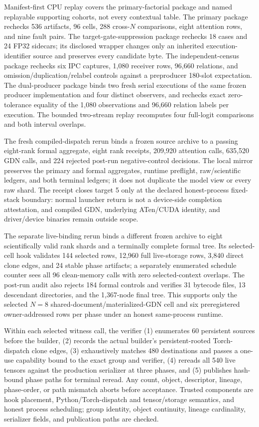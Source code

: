 \documentclass{article}
\begin{document}
Manifest-first CPU replay covers the primary-factorial package and named
replayable supporting cohorts, not every contextual table.  The primary package
rechecks 536 artifacts, 96 cells, 288 cross-$N$ comparisons, eight attention
rows, and nine fault pairs.  The target-gate-suppression package rechecks 18
cases and 24 FP32 sidecars; its disclosed wrapper changes only an inherited
execution-identifier source and preserves every candidate byte.  The
independent-census package rechecks six IPC captures, 1,080 receiver rows,
96,660 relations, and omission/duplication/relabel controls against a
preproducer 180-slot expectation.  The dual-producer package binds two fresh
serial executions of the same frozen producer implementation and four distinct
observers, and rechecks exact zero-tolerance equality of the 1,080 observations
and 96,660 relation labels per execution.  The
bounded two-stream replay recomputes four full-logit comparisons and both
interval overlaps.

The fresh compiled-dispatch rerun binds a frozen source archive to a passing
eight-rank formal aggregate, eight rank receipts, 209,920 attention calls,
635,520 GDN calls, and 224 rejected post-run negative-control decisions.  The
local mirror preserves the primary and formal aggregates, runtime preflight,
raw/scientific ledgers, and both terminal ledgers; it does not duplicate the
model view or every raw shard.  The receipt closes target 5 only at the
declared honest-process fixed-stack boundary: normal launcher return is not a
device-side completion attestation, and compiled GDN, underlying ATen/CUDA
identity, and driver/device binaries remain outside scope.

The separate live-binding rerun binds a different frozen archive to eight
scientifically valid rank shards and a terminally complete formal tree.  Its
selected-cell hook validates 144 selected rows, 12,960 full live-storage rows,
3,840 direct clone edges, and 24 stable phase artifacts; a separately enumerated
schedule counter sees all 96 clean-memory calls with zero selected-context
overlaps.  The
post-run audit also rejects 184 formal controls and verifies 31 bytecode files,
13 descendant directories, and the 1,367-node final tree.  This supports only
the selected $N=8$ shared-document/materialized-GDN cell and six preregistered
owner-addressed rows per phase under an honest same-process runtime.

Within each selected witness call, the verifier (1) enumerates 60 persistent
sources before the builder, (2) records the actual builder's persistent-rooted
Torch-dispatch clone edges, (3) exhaustively matches 480 destinations and passes
a one-use capability bound to the exact group and verifier, (4) rereads all 540
live tensors against the production serializer at three phases, and (5)
publishes hash-bound phase paths for terminal reread.  Any count, object,
descriptor, lineage, phase-order, or path mismatch aborts before acceptance.
Trusted components are hook placement, Python/Torch-dispatch and tensor/storage
semantics, and honest process scheduling; group identity, object continuity,
lineage cardinality, serializer fields, and publication paths are checked.
\end{document}

